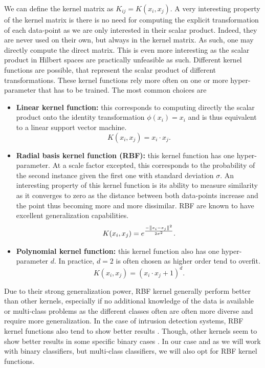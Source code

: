 We can define the kernel matrix as $K_{ij} = K(x_i,x_j)$. A very interesting property of the kernel matrix is there is no need for computing the explicit transformation of each data-point as we are only interested in their scalar product. Indeed, they are never used on their own, but always in the kernel matrix. As such, one may directly compute the direct matrix. This is even more interesting as the scalar product in Hilbert spaces are practically unfeasible as such. Different kernel functions are possible, that represent the scalar product of different transformations. These kernel functions rely more often on one or more hyper-parameter that has to be trained. The most common choices are
\begin{itemize}
    \item \textbf{Linear kernel function:} this corresponds to computing directly the scalar product onto the identity transformation $\phi(x_i)=x_i$ and is thus equivalent to a linear support vector machine.
    \begin{equation}
        K(x_i,x_j) = x_i \cdot x_j.
    \end{equation}
    \item \textbf{Radial basis kernel function (RBF):} this kernel function has one hyper-parameter. At a scale factor excepted, this corresponds to the probability of the second instance given the first one with standard deviation $\sigma$. An interesting property of this kernel function is its ability to measure similarity as it converges to zero as the distance between both data-points increase and the point thus becoming more and more dissimilar. RBF are known to have excellent generalization capabilities.
    \begin{equation}
        K(x_i,x_j) = e^{\frac{-\left\lVert x_i-x_j\right\rVert^2}{2\sigma^2}}.
    \end{equation}
    \item \textbf{Polynomial kernel function:} this kernel function also has one hyper-parameter $d$. In practice, $d=2$ is often chosen as higher order tend to overfit.
    \begin{equation}
        K(x_i,x_j) = (x_i \cdot x_j +1)^d.
    \end{equation}
\end{itemize}

Due to their strong generalization power, RBF kernel generally perform better than other kernels, especially if no additional knowledge of the data is available or multi-class problems as the different classes often are often more diverse and require more generalization. In the case of intrusion detection systems, RBF kernel functions also tend to show better results \cite{Kuang2014ADetection}. Though, other kernels seem to show better results in some specific binary cases \cite{Elkhadir2016IntrusionMethods}. In our case and as we will work with binary classifiers, but multi-class classifiers, we will also opt for RBF kernel functions.

